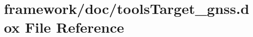 \hypertarget{tools_target__gnss_8dox}{}\section{framework/doc/tools\+Target\+\_\+gnss.dox File Reference}
\label{tools_target__gnss_8dox}
